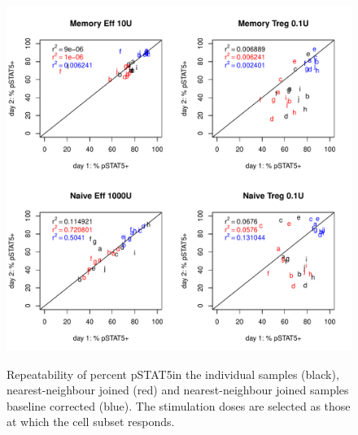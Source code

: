 \begin{figure}
\begin{minipage}{.65\textwidth}
\includegraphics[width=\linewidth]{figures/pstat5-pos-cellsubsets-repeatability}
\end{minipage}
\begin{minipage}{.3\textwidth}
{ Repeatability of percent pSTAT5\positive in the individual samples (black), nearest-neighbour joined (red) and nearest-neighbour joined samples baseline corrected (blue). }
{
  The stimulation doses are selected as those at which the cell subset responds.
}
\end{minipage}
\end{figure}




